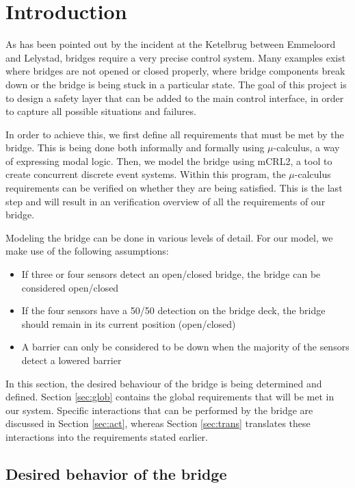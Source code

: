\section{Introduction}

As has been pointed out by the incident at the Ketelbrug between Emmeloord and Lelystad, bridges require a very precise control system.  Many examples exist where bridges are not opened or closed properly, where bridge components break down or the bridge is being stuck in a particular state. The goal of this project is to design a safety layer that can be added to the main control interface, in order to capture all possible situations and failures.

In order to achieve this, we first define all requirements that must be met by the bridge. This is being done both informally and formally using $\mu$-calculus, a way of expressing modal logic. Then, we model the bridge using mCRL2, a tool to create concurrent discrete event systems. Within this program, the $\mu$-calculus requirements can be verified on whether they are being satisfied. This is the last step and will result in an verification overview of all the requirements of our bridge.

Modeling the bridge can be done in various levels of detail. For our model, we make use of the following assumptions:
%
\begin{itemize}
	\item If three or four sensors detect an open/closed bridge, the bridge can be considered open/closed
	\item If the four sensors	 have a 50/50 detection on the bridge deck, the bridge should remain in its current position (open/closed)
	\item A barrier can only be considered to be down when the majority of the sensors detect a lowered barrier
\end{itemize}
%
In this section, the desired behaviour of the bridge is being determined and defined. Section \ref{sec:glob} contains the global requirements that will be met in our system. Specific interactions that can be performed by the bridge are discussed in Section \ref{sec:act}, whereas Section \ref{sec:trans} translates these interactions into the requirements stated earlier.

\subsection{Desired behavior of the bridge}

